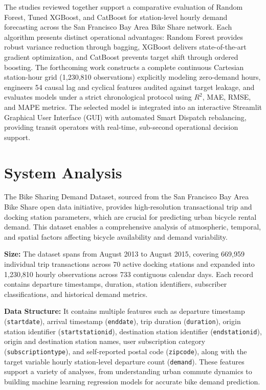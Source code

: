 \documentclass[12pt, a4paper]{article}
\renewcommand{\_}{\textunderscore\allowbreak}
\begin{document}
The studies reviewed together support a comparative evaluation of Random Forest, Tuned XGBoost, and CatBoost for station-level hourly demand forecasting across the San Francisco Bay Area Bike Share network. Each algorithm presents distinct operational advantages: Random Forest provides robust variance reduction through bagging, XGBoost delivers state-of-the-art gradient optimization, and CatBoost prevents target shift through ordered boosting. The forthcoming work constructs a complete continuous Cartesian station-hour grid (1,230,810 observations) explicitly modeling zero-demand hours, engineers 54 causal lag and cyclical features audited against target leakage, and evaluates models under a strict chronological protocol using $R^2$, MAE, RMSE, and MAPE metrics. The selected model is integrated into an interactive Streamlit Graphical User Interface (GUI) with automated Smart Dispatch rebalancing, providing transit operators with real-time, sub-second operational decision support.

\clearpage

\section{System Analysis}

The Bike Sharing Demand Dataset, sourced from the San Francisco Bay Area Bike Share open data initiative, provides high-resolution transactional trip and docking station parameters, which are crucial for predicting urban bicycle rental demand. This dataset enables a comprehensive analysis of atmospheric, temporal, and spatial factors affecting bicycle availability and demand variability.

\vspace{0.2cm}
\noindent \textbf{Size:} The dataset spans from August 2013 to August 2015, covering 669,959 individual trip transactions across 70 active docking stations and expanded into 1,230,810 hourly observations across 733 contiguous calendar days. Each record contains departure timestamps, duration, station identifiers, subscriber classifications, and historical demand metrics.

\vspace{0.2cm}
\noindent \textbf{Data Structure:} It contains multiple features such as departure timestamp (\texttt{start\_date}), arrival timestamp (\texttt{end\_date}), trip duration (\texttt{duration}), origin station identifier (\texttt{start\_station\_id}), destination station identifier (\texttt{end\_station\_id}), origin and destination station names, user subscription category (\texttt{subscription\_type}), and self-reported postal code (\texttt{zip\_code}), along with the target variable hourly station-level departure count (\texttt{demand}). These features support a variety of analyses, from understanding urban commute dynamics to building machine learning regression models for accurate bike demand prediction.
\end{document}

